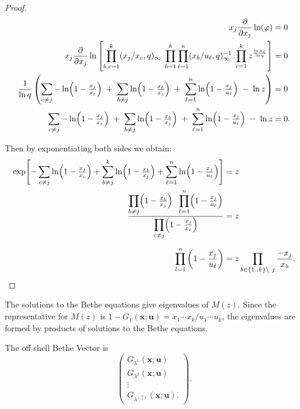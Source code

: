 \documentclass[12pt]{article}
\theoremstyle{plain}
\theoremstyle{definition}
\newcommand{\xb}{\boldsymbol{x}}
\newcommand{\ub}{\boldsymbol{u}}
\begin{document}
\begin{proof}
\begin{align*}
x_j\frac{\partial}{\partial x_j}\ln(\varphi) &= 0\\
x_j\frac{\partial}{\partial x_j}\ln\left[\prod \limits_{b,c=1} ^k(x_j/x_c,q)_\infty\;\prod_{b=1}^k\prod_{\ell=1}^n(x_b/u_\ell ,q)_\infty^{-1}\; \prod \limits_{c=1} ^k z^{\frac{\ln x_c}{\ln q}}\right]
&=0
\\
\frac{1}{\ln q}\left(\sum_{c\neq j} -\ln\Bigl(1 - \tfrac{x_j}{x_c}\Bigr)
\;+\;
\sum_{b\neq j} \ln\Bigl(1 - \tfrac{x_b}{x_j}\Bigr)
\;+\;
\sum_{\ell=1}^n \ln\Bigl(1 - \tfrac{x_j}{u_\ell}\Bigr)
\;-\;\ln z
\right)&=0\\
\sum_{c\neq j} -\ln\Bigl(1 - \tfrac{x_j}{x_c}\Bigr)
\;+\;
\sum_{b\neq j} \ln\Bigl(1 - \tfrac{x_b}{x_j}\Bigr)
\;+\;
\sum_{\ell=1}^n \ln\Bigl(1 - \tfrac{x_j}{u_\ell}\Bigr)
\;-\;\ln z
&=0.
\end{align*}


Then by exponentiating both sides we obtain:
\begin{align*}
\exp\Biggl[
  -\sum_{c\neq j}\ln\Bigl(1 - \tfrac{x_j}{x_c}\Bigr)
  + \sum_{b\neq j}^k\ln\Bigl(1 - \tfrac{x_b}{x_j}\Bigr)
  + \sum_{\ell=1}^n\ln\Bigl(1 - \tfrac{x_j}{u_\ell}\Bigr)
\Biggr]
&=z
\\
\frac{
  \displaystyle\prod_{b\neq j}\Bigl(1 - \tfrac{x_b}{x_j}\Bigr)
  \;\;\displaystyle\prod_{\ell=1}^n\Bigl(1 - \tfrac{x_j}{u_\ell}\Bigr)
}{
  \displaystyle\prod_{c\neq j}\Bigl(1 - \tfrac{x_j}{x_c}\Bigr)
}
&=z
\\[6pt]
\prod \limits_{l=1}^n \left(1-\frac{x_j}{u_\ell}\right)&= z \prod \limits_{b\in \{1..k\} \setminus\  j}\frac{-x_j}{x_b} .
\end{align*}
\end{proof}

The solutions to the Bethe equations give eigenvalues of $M(z)$. Since the representative for $M(z)$ is $1-G_1(\xb ;\ub)=x_1\cdots x_k/{u_1\cdots u_k}$, the eigenvalues are formed by products of solutions to the Bethe equations.
   

The off shell Bethe Vector is
$$\begin{pmatrix}
    G_{\lambda^1} (\xb ;\ub) \\
    G_{\lambda^2} (\xb ;\ub)\\
    \vdots\\
    G_{\lambda^{\binom{n}{k}}}(\xb ;\ub).
\end{pmatrix}.$$
\end{document}
